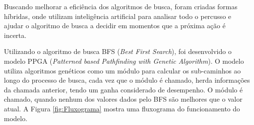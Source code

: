 Buscando melhorar a eficiência dos algoritmos de busca, foram criadas formas híbridas, onde utilizam inteligência artificial para analisar todo o percusso e ajudar o algoritmo de busca a decidir em momentos que a próxima ação é incerta.

Utilizando o algoritmo de busca BFS (\textit{Best First Search}), foi desenvolvido o modelo PPGA (\textit{Patterned based Pathfinding with Genetic Algorithm}). O modelo utiliza algoritmos genéticos como um módulo para calcular os sub-caminhos ao longo do processo de busca, cada vez que o módulo é chamado, herda informações da chamada anterior, tendo um ganha considerado de desempenho. O módulo é chamado, quando nenhum dos valores dados pelo BFS são melhores que o valor atual. A Figura \ref{fig:Fluxograma}  mostra uma fluxograma do funcionamento do modelo.

\begin{minipage}{\linewidth}
	\label{fig:Fluxograma}
\end{minipage}

